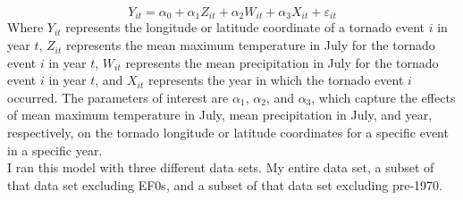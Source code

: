 \documentclass[12pt,english]{article}
\begin{document}
\begin{equation}
Y_{it} = \alpha_0 + \alpha_1 Z_{it} + \alpha_2 W_{it} + \alpha_3 X_{it} + \varepsilon_{it}
\end{equation}
\hspace{1cm} Where $Y_{it}$ represents the longitude or latitude coordinate of a tornado event $i$ in year $t$, $Z_{it}$ represents the mean maximum temperature in July for the tornado event $i$ in year $t$, $W_{it}$ represents the mean precipitation in July for the tornado event $i$ in year $t$, and $X_{it}$ represents the year in which the tornado event $i$ occurred. The parameters of interest are $\alpha_1$, $\alpha_2$, and $\alpha_3$, which capture the effects of mean maximum temperature in July, mean precipitation in July, and year, respectively, on the tornado longitude or latitude coordinates for a specific event in a specific year.\\
I ran this model with three different data sets. My entire data set, a subset of that data set excluding EF0s, and a subset of that data set excluding pre-1970. 
\end{document}
